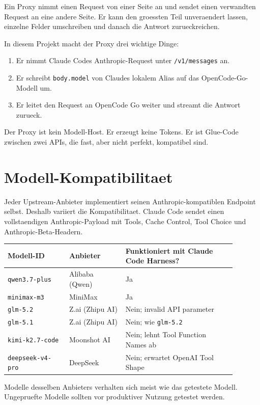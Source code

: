 \documentclass[11pt,a4paper]{article}
\newcommand{\code}[1]{\texttt{#1}}
\begin{document}
Ein Proxy nimmt einen Request von einer Seite an und sendet einen verwandten
Request an eine andere Seite. Er kann den groessten Teil unveraendert lassen,
einzelne Felder umschreiben und danach die Antwort zurueckreichen.

In diesem Projekt macht der Proxy drei wichtige Dinge:

\begin{enumerate}
  \item Er nimmt Claude Codes Anthropic-Request unter \code{/v1/messages} an.
  \item Er schreibt \code{body.model} von Claudes lokalem Alias auf das OpenCode-Go-Modell um.
  \item Er leitet den Request an OpenCode Go weiter und streamt die Antwort zurueck.
\end{enumerate}

Der Proxy ist kein Modell-Host. Er erzeugt keine Tokens. Er ist Glue-Code
zwischen zwei APIs, die fast, aber nicht perfekt, kompatibel sind.

\section{Modell-Kompatibilitaet}

Jeder Upstream-Anbieter implementiert seinen Anthropic-kompatiblen Endpoint
selbst. Deshalb variiert die Kompatibilitaet. Claude Code sendet einen
vollstaendigen Anthropic-Payload mit Tools, Cache Control, Tool Choice und
Anthropic-Beta-Headern.

\begin{longtable}{|p{0.24\linewidth}|p{0.22\linewidth}|p{0.43\linewidth}|}
\hline
\textbf{Modell-ID} & \textbf{Anbieter} & \textbf{Funktioniert mit Claude Code Harness?} \\
\hline
\code{qwen3.7-plus} & Alibaba (Qwen) & Ja \\
\hline
\code{minimax-m3} & MiniMax & Ja \\
\hline
\code{glm-5.2} & Z.ai (Zhipu AI) & Nein; invalid API parameter \\
\hline
\code{glm-5.1} & Z.ai (Zhipu AI) & Nein; wie \code{glm-5.2} \\
\hline
\code{kimi-k2.7-code} & Moonshot AI & Nein; lehnt Tool Function Names ab \\
\hline
\code{deepseek-v4-pro} & DeepSeek & Nein; erwartet OpenAI Tool Shape \\
\hline
\end{longtable}

Modelle desselben Anbieters verhalten sich meist wie das getestete Modell.
Ungepruefte Modelle sollten vor produktiver Nutzung getestet werden.
\end{document}
